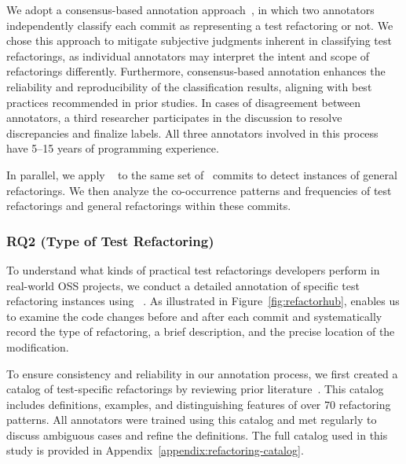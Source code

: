 We adopt a consensus-based annotation approach~\cite{DBLP:conf/emnlp/SnowOJN08, oortwijn-etal-2021-interrater}, in which two annotators independently classify each commit as representing a test refactoring or not. We chose this approach to mitigate subjective judgments inherent in classifying test refactorings, as individual annotators may interpret the intent and scope of refactorings differently. Furthermore, consensus-based annotation enhances the reliability and reproducibility of the classification results, aligning with best practices recommended in prior studies. In cases of disagreement between annotators, a third researcher participates in the discussion to resolve discrepancies and finalize labels. All three annotators involved in this process have 5–15 years of programming experience.

In parallel, we apply \rminer~\cite{DBLP:journals/tosem/AlikhanifardT25} to the same set of \ManualInspectionCommit\ commits to detect instances of general refactorings. We then analyze the co-occurrence patterns and frequencies of test refactorings and general refactorings within these commits.



\subsubsection{RQ2 (Type of Test Refactoring) }

To understand what kinds of practical test refactorings developers perform in real-world OSS projects, we conduct a detailed annotation of specific test refactoring instances using \rhub~\cite{DBLP:conf/iwpc/KuramotoSH21}. As illustrated in Figure~\ref{fig:refactorhub}, \rhub enables us to examine the code changes before and after each commit and systematically record the type of refactoring, a brief description, and the precise location of the modification. 

To ensure consistency and reliability in our annotation process, we first created a catalog of test-specific refactorings by reviewing prior literature~\cite{xUnitTestPatterns, DBLP:journals/tse/SoaresRGAS23, DBLP:journals/ese/MartinsPCFPM25, DBLP:conf/scam/MartinsCRPM23, DBLP:journals/tosem/AlikhanifardT25}. This catalog includes definitions, examples, and distinguishing features of over 70 refactoring patterns. All annotators were trained using this catalog and met regularly to discuss ambiguous cases and refine the definitions. The full catalog used in this study is provided in Appendix~\ref{appendix:refactoring-catalog}.

